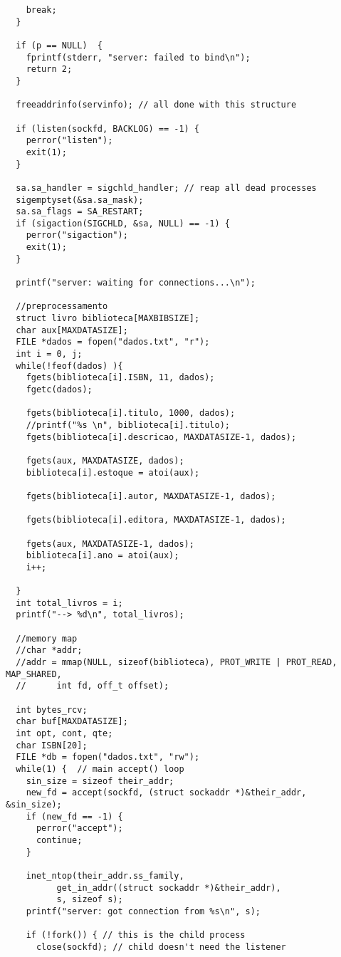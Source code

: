 \documentclass[11pt, brazil]{article} %
\begin{document}
\begin{verbatim}
    break;
  }

  if (p == NULL)  {
    fprintf(stderr, "server: failed to bind\n");
    return 2;
  }

  freeaddrinfo(servinfo); // all done with this structure

  if (listen(sockfd, BACKLOG) == -1) {
    perror("listen");
    exit(1);
  }

  sa.sa_handler = sigchld_handler; // reap all dead processes
  sigemptyset(&sa.sa_mask);
  sa.sa_flags = SA_RESTART;
  if (sigaction(SIGCHLD, &sa, NULL) == -1) {
    perror("sigaction");
    exit(1);
  }

  printf("server: waiting for connections...\n");

  //preprocessamento
  struct livro biblioteca[MAXBIBSIZE];
  char aux[MAXDATASIZE];
  FILE *dados = fopen("dados.txt", "r");
  int i = 0, j;
  while(!feof(dados) ){
    fgets(biblioteca[i].ISBN, 11, dados);
    fgetc(dados);
		
    fgets(biblioteca[i].titulo, 1000, dados);
    //printf("%s \n", biblioteca[i].titulo);
    fgets(biblioteca[i].descricao, MAXDATASIZE-1, dados);
		
    fgets(aux, MAXDATASIZE, dados);
    biblioteca[i].estoque = atoi(aux);
		
    fgets(biblioteca[i].autor, MAXDATASIZE-1, dados);
		
    fgets(biblioteca[i].editora, MAXDATASIZE-1, dados);
		
    fgets(aux, MAXDATASIZE-1, dados);
    biblioteca[i].ano = atoi(aux);
    i++;
		
  }
  int total_livros = i;
  printf("--> %d\n", total_livros);
	
  //memory map
  //char *addr;
  //addr = mmap(NULL, sizeof(biblioteca), PROT_WRITE | PROT_READ, MAP_SHARED,
  //      int fd, off_t offset);
	
  int bytes_rcv;
  char buf[MAXDATASIZE];
  int opt, cont, qte;
  char ISBN[20];
  FILE *db = fopen("dados.txt", "rw");
  while(1) {  // main accept() loop
    sin_size = sizeof their_addr;
    new_fd = accept(sockfd, (struct sockaddr *)&their_addr, &sin_size);
    if (new_fd == -1) {
      perror("accept");
      continue;
    }

    inet_ntop(their_addr.ss_family,
	      get_in_addr((struct sockaddr *)&their_addr),
	      s, sizeof s);
    printf("server: got connection from %s\n", s);

    if (!fork()) { // this is the child process
      close(sockfd); // child doesn't need the listener
			

\end{verbatim}
\end{document}
